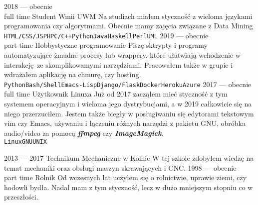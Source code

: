 \documentclass[9pt]{developercv} %
\begin{document}
\begin{entrylist}
    \entry
    {2018 --- obecnie\\\footnotesize{full time}}
    {Student}
    {Wmii UWM}
    {Na studiach miałem styczność z wieloma językami programowania czy algorytmami. Obecnie mamy zajęcia związane z Data Mining\\ \texttt{HTML/CSS/JS}\slashsep\texttt{PHP}\slashsep\texttt{C/C++}\slashsep\texttt{Python}\slashsep\texttt{Java}\slashsep\texttt{Haskell}\slashsep\texttt{Perl}\slashsep\texttt{UML}}
    \entry
    {2019 --- obecnie\\\footnotesize{part time}}
    {Hobbystyczne programowanie}
    {}
    {Piszę sktrypty i programy automatyzujące żmudne procesy lub wrappery, które ułatwiają wchodzenie w interakcję ze skomplikowamymi narzędziami. Pracowałem także w grupie i wdrażałem aplikację na chmurę, czy hosting.\\ \texttt{Python}\slashsep\texttt{Bash/Shell}\slashsep\texttt{Emacs-Lisp}\slashsep\texttt{Django/Flask}\slashsep\texttt{Docker}\slashsep\texttt{Heroku}\slashsep\texttt{Azure}}
    \entry
    {2017 --- obecnie\\\footnotesize{full time}}
    {Użytkownik Linuxa}
    {}
    {Już od 2017 zacząłem mieć styczność z tym systemem operacyjnym i wieloma jego dystrybucjami, a w 2019 całkowicie się na niego przerzuciłem. Jestem także biegły w posługiwaniu się edytorami tekstowym vim czy Emacs, używaniu i łączeniu różnych narzędzi z pakietu GNU, obróbka audio/video za pomocą \textbf{\textit{ffmpeg}} czy \textbf{\textit{ImageMagick}}.\\ \texttt{Linux}\slashsep\texttt{GNU}\slashsep\texttt{UNIX}}
\end{entrylist}



\begin{entrylist}
    \entry
    {2013 --- 2017}
    {Technikum Mechaniczne w Kolnie}
    {}
    {W tej szkole zdobyłem wiedzę na temat mechaniki oraz obsługi maszyn skrawających i CNC.}
    \entry
    {1998 --- obecnie\\\footnotesize{part time}}
    {Rolnik}
    {}
    {Od wczesnych lat uczyłem się o rolnictwie, uprawie ziemi, czy hodowli bydła. Nadal mam z tym styczność, lecz w dużo mniejszym stopniu co w przeszłości.}
\end{entrylist}
\end{document}
